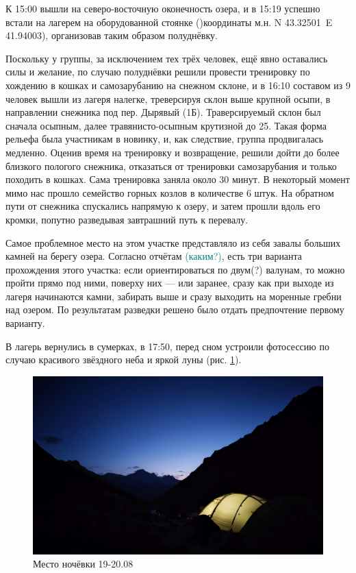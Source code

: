 К 15:00 вышли на северо-восточную оконечность озера, и в 15:19 успешно встали на лагерем на оборудованной стоянке ()координаты м.н. N 43.32501\degree~E 41.94003\degree), организовав таким образом полуднёвку.

Поскольку у группы, за исключением тех трёх человек, ещё явно оставались силы и желание, по случаю полуднёвки решили провести тренировку по хождению в кошках и самозарубанию на снежном склоне, и в 16:10 составом из 9 человек вышли из лагеря налегке, треверсируя склон выше крупной осыпи, в направлении снежника под пер. Дырявый (1Б). Траверсируемый склон был сначала осыпным, далее травянисто-осыпным крутизной до 25\degree. Такая форма рельефа была участникам в новинку, и, как следствие, группа продвигалась медленно. Оценив время на тренировку и возвращение, решили дойти до более близкого пологого снежника, отказаться от тренировки самозарубания и только походить в кошках. Сама тренировка заняла около 30 минут. В некоторый момент мимо нас прошло семейство горных козлов в количестве 6 штук.
На обратном пути от снежника спускались напрямую к озеру, и затем прошли вдоль его кромки, попутно разведывая завтрашний путь к перевалу. 

Самое проблемное место на этом участке представляло из себя завалы больших камней на берегу озера. Согласно отчётам \textcolor{teal}{(каким?)}, есть три варианта прохождения этого участка: если ориентироваться по двум\alert{(?)} валунам, то можно пройти прямо под ними, поверху них --- или заранее, сразу как при выходе из лагеря начинаются камни, забирать выше и сразу выходить на моренные гребни над озером. По результатам разведки решено было отдать предпочтение первому варианту.

В лагерь вернулись в сумерках, в 17:50, перед сном устроили фотосессию по случаю красивого звёздного неба и яркой луны (рис. \ref{fig:IMG_20240829_194851}).

\begin{figure}[h!]
	\centering
	\includegraphics[width=0.7\linewidth]{../pics/IMG_20240829_194851}
	\caption{Место ночёвки 19-20.08}
	\label{fig:IMG_20240829_194851}
\end{figure}

\clearpage